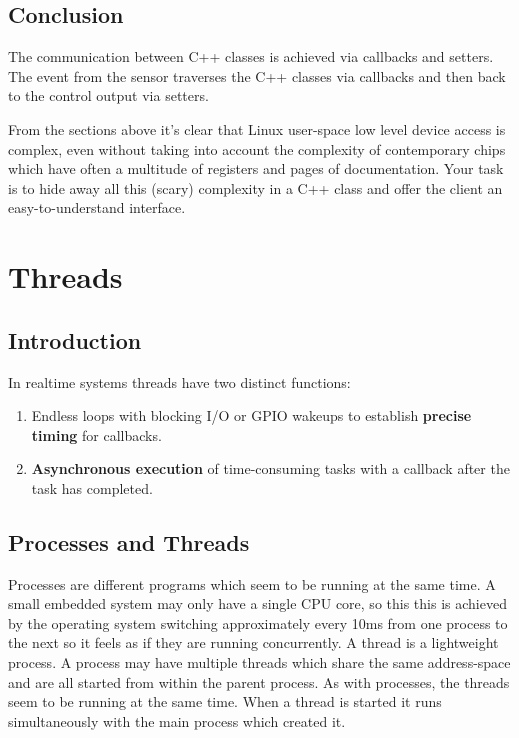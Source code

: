 \documentclass[12pt]{report}
\begin{document}
\section{Conclusion}
The communication between C++ classes is achieved via
callbacks and setters. The event from the sensor traverses
the C++ classes via callbacks and then back to the control
output via setters.

From the sections above it's clear that Linux user-space low level
device access is complex, even without taking into account the
complexity of contemporary chips which have often a multitude of
registers and pages of documentation. Your task is to hide away
all this (scary) complexity in a C++ class and offer the client
an easy-to-understand interface.





\chapter{Threads\label{threads}}

\section{Introduction}
In realtime systems threads have two distinct functions:
\begin{enumerate}
\item Endless loops with blocking I/O or GPIO wakeups
  to establish \textbf{precise timing} for callbacks.
\item \textbf{Asynchronous execution} of time-consuming tasks
  with a callback after the task has completed.
\end{enumerate}


\section{Processes and Threads}
Processes are different programs which seem to be running at the same
time. A small embedded system may only have a single CPU core,
so this this is achieved by the operating system switching
approximately every 10ms from one process to the next so it feels as
if they are running concurrently. A thread is a lightweight
process. A process may have  multiple threads which share the same
address-space and are all started from
within the parent process. As with processes, the threads seem to be
running at the same time. When a thread is started it runs
simultaneously with the main process which created it.
\end{document}

